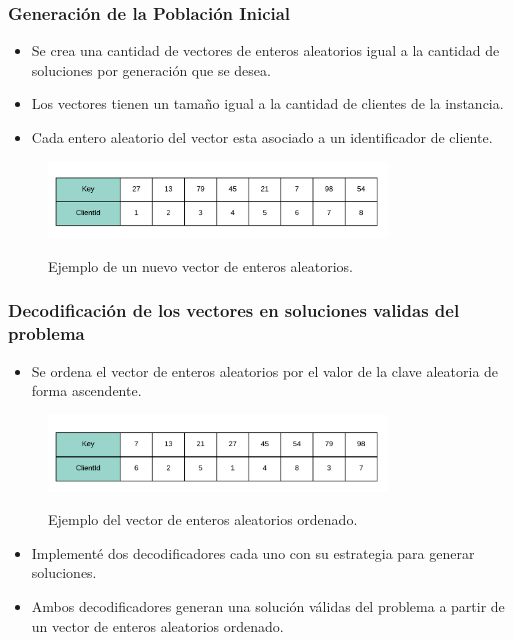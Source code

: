 \documentclass{beamer}
\begin{document}
\begin{frame}
\frametitle{Generación de la Población Inicial}

\begin{itemize}
    \item Se crea una cantidad de vectores de enteros aleatorios igual a la cantidad de soluciones por generación que se desea.
    \pause
    \item Los vectores tienen un tamaño igual a la cantidad de clientes de la instancia.
    \pause
    \item Cada entero aleatorio del vector esta asociado a un identificador de cliente.
    \pause
\end{itemize}

\begin{figure}[h]
	\caption{Ejemplo de un nuevo vector de enteros aleatorios.}
	\centering
	\includegraphics[width=9cm]{RandomKeysInicializado}
	\label{fig:RandomKeysInicializado}
\end{figure}

\end{frame}


\begin{frame}
\frametitle{Decodificación de los vectores en soluciones validas del problema}

\begin{itemize}
    \item Se ordena el vector de enteros aleatorios por el valor de la clave aleatoria de forma ascendente.
    \pause
\end{itemize}

\begin{figure}[h]
	\caption{Ejemplo del vector de enteros aleatorios ordenado.}
	\centering
	\includegraphics[width=9cm]{RandomKeysOrdenado}
	\label{fig:RandomKeysOrdenado}
\end{figure}

\begin{itemize}
    \pause
    \item Implementé dos decodificadores cada uno con su estrategia para generar soluciones.
    \pause
    \item Ambos decodificadores generan una solución válidas del problema a partir de un vector de enteros aleatorios ordenado.
\end{itemize}

\end{frame}
\end{document}
